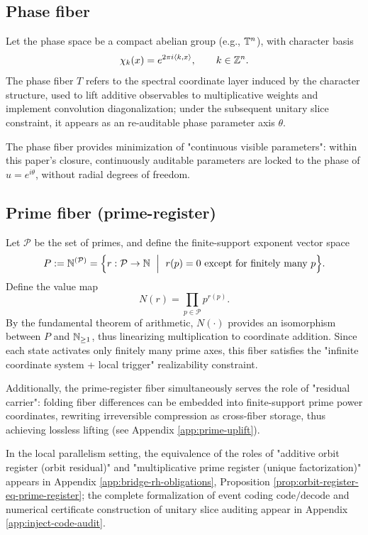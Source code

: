 \subsection{Phase fiber}
\begin{definition}\label{def:phase-fiber}
Let the phase space be a compact abelian group (e.g., $\mathbb{T}^n$), with character basis
$$
\chi_k(x)=e^{2\pi i\langle k,x\rangle},\qquad k\in\mathbb{Z}^n.
$$
The phase fiber $T$ refers to the spectral coordinate layer induced by the character structure, used to lift additive observables to multiplicative weights and implement convolution diagonalization; under the subsequent unitary slice constraint, it appears as an re-auditable phase parameter axis $\theta$.\par
\end{definition}

The phase fiber provides minimization of "continuous visible parameters": within this paper's closure, continuously auditable parameters are locked to the phase of $u=e^{i\theta}$, without radial degrees of freedom.\par

\subsection{Prime fiber (prime-register)}
\begin{definition}\label{def:prime-register-fiber}
Let $\mathcal{P}$ be the set of primes, and define the finite-support exponent vector space
$$
P := \NN^{(\mathcal{P})}=\Bigl\{r:\mathcal{P}\to\NN\ \Bigm|\ r(p)=0\ \text{except for finitely many }p\Bigr\}.
$$
Define the value map
$$
N(r)=\prod_{p\in\mathcal{P}} p^{r(p)}.
$$
By the fundamental theorem of arithmetic, $N(\cdot)$ provides an isomorphism between $P$ and $\mathbb{N}_{\ge 1}$, thus linearizing multiplication to coordinate addition. Since each state activates only finitely many prime axes, this fiber satisfies the "infinite coordinate system + local trigger" realizability constraint.\par
\end{definition}

Additionally, the prime-register fiber simultaneously serves the role of "residual carrier": folding fiber differences can be embedded into finite-support prime power coordinates, rewriting irreversible compression as cross-fiber storage, thus achieving lossless lifting (see Appendix \ref{app:prime-uplift}).\par
In the local parallelism setting, the equivalence of the roles of "additive orbit register (orbit residual)" and "multiplicative prime register (unique factorization)" appears in Appendix \ref{app:bridge-rh-obligations}, Proposition \ref{prop:orbit-register-eq-prime-register}; the complete formalization of event coding $\mathrm{code}/\mathrm{decode}$ and numerical certificate construction of unitary slice auditing appear in Appendix \ref{app:inject-code-audit}.\par

